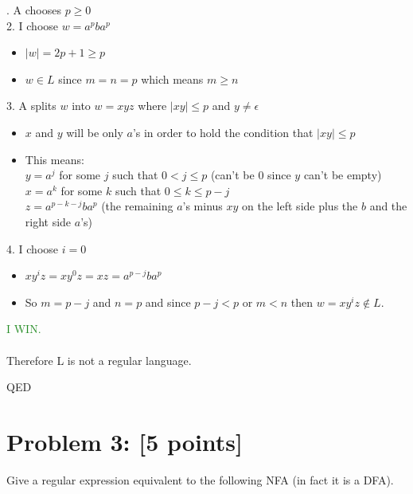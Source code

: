 \documentclass[11pt, letterpaper]{article}
\begin{document}
\vspace{5mm}

. $\mathrm{A}$ chooses $p \geq 0$ \\ 
	       2. I choose $w = a^pba^p$
	       \begin{itemize}
			\item{$|w| = 2p + 1 \geq p$}
			\item{$w \in L$} since $m = n = p$ which means $m \geq n$
	       \end{itemize}
	       3. $\mathrm{A}$ splits $w$ into $w = xyz$ where $|xy| \leq p$ and $y \neq \epsilon$ 
	       \begin{itemize}
	       		\item{$x$ and $y$ will be only $a$'s in order to hold the condition that $|xy| \leq p$}
			\item{This means: \\ $y = a^j$ for some $j$ such that $0 < j \leq p$ (can't be 0 since $y$ can't be empty) \\ $x = a^k$ for some $k$ such that $0 \leq k \leq p - j$ \\ $z = a^{p-k-j}ba^p$ (the remaining $a$'s minus $xy$ on the left side plus the $b$ and the right side $a$'s)}
	       \end{itemize}
	       4. I choose $i = 0$
	        \begin{itemize}
	       		\item{$xy^iz = xy^0z = xz = a^{p - j}ba^p$}
			\item{So $m = p - j$ and $n = p$ and since $p - j < p$ or $m < n$ then $w = xy^iz \notin L$.}
	       \end{itemize}

\vspace{5mm}

\noindent \textcolor{ForestGreen}{I WIN.}\\\\ Therefore L is not a regular language.

\vspace{5mm}

\noindent QED

\newpage

\section*{Problem 3: [5 points]}

Give a regular expression equivalent to the following NFA (in fact it is a DFA).

\vspace{5mm}
\end{document}
